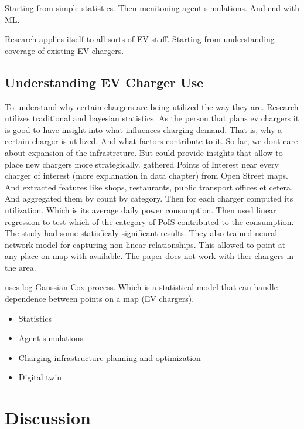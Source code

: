 Starting from simple statistics. Then menitoning agent simulations. And end with ML.

Research applies itself to all sorts of EV stuff. Starting from understanding coverage of existing EV chargers.

\subsection{Understanding EV Charger Use}

To understand why certain chargers are being utilized the way they are. Research utilizes traditional and bayesian statistics. As the person that plans ev chargers it is good to have insight into what influences charging demand. That is, why a certain charger is utilized. And what factors contribute to it. So far, we dont care about expansion of the infrastrcture. But could provide insights that allow to place new chargers more strategically.  gathered Points of Interest near every charger of interest (more explanation in data chapter) from Open Street maps. And extracted features like shops, restaurants, public transport offices et cetera. And aggregated them by count by category. Then for each charger computed its utilization. Which is its average daily power consumption. Then used linear regression to test which of the category of PoIS contributed to the consumption. The study had some statisficaly significant results. They also trained neural network model for capturing non linear relationships. This allowed to point at any place on map with available. The paper does not work with ther chargers in the area.

 uses log-Gaussian Cox process. Which is a statistical model that can handle dependence between points on a map (EV chargers).



\begin{itemize}
    \item Statistics
    \item Agent simulations
    \item Charging infrastructure planning and optimization
    \item Digital twin
\end{itemize}

\section{Discussion}

